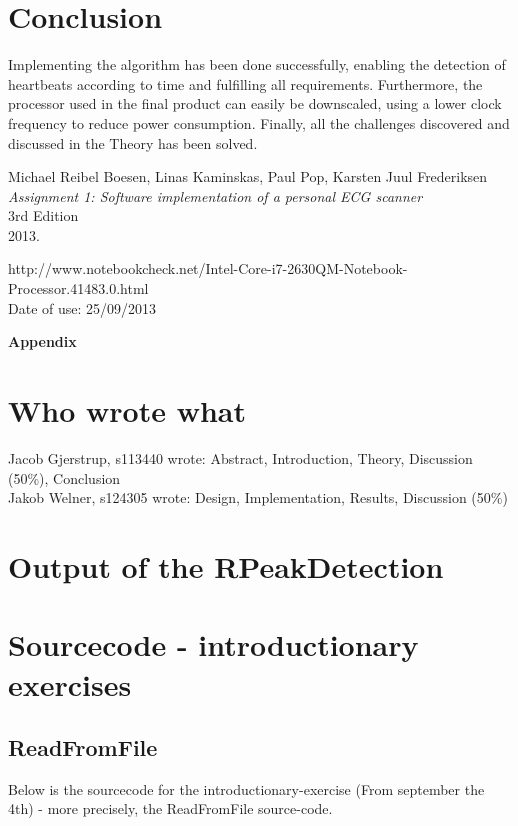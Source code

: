 \documentclass[12pt,a4paper]{article}
\begin{document}
\section{Conclusion}
	Implementing the algorithm has been done successfully, enabling the detection of heartbeats according to time and fulfilling all requirements. Furthermore, the processor  used in the final product can easily be downscaled, using a lower clock frequency to reduce power consumption. Finally, all the challenges discovered and discussed in the Theory has been solved.
\newpage
\begin{thebibliography}{9}

  Michael Reibel Boesen, Linas Kaminskas, Paul Pop, Karsten Juul Frederiksen\\
  \emph{Assignment 1: Software implementation of a personal ECG scanner}\\
  3rd Edition\\
  2013.

	http://www.notebookcheck.net/Intel-Core-i7-2630QM-Notebook-Processor.41483.0.html\\
	Date of use: 25/09/2013
\end{thebibliography}
	
\newpage	
	\begin{Large}
		\textbf{Appendix}
	\end{Large}
	\appendix

\section{Who wrote what}
Jacob Gjerstrup, s113440 wrote: Abstract, Introduction, Theory, Discussion (50\%), Conclusion\\
Jakob Welner, s124305 wrote: Design, Implementation, Results, Discussion (50\%)\\

\section{Output of the RPeakDetection}
	

	
\section{Sourcecode - introductionary exercises}
\subsection{ReadFromFile}
	Below is the sourcecode for the introductionary-exercise (From september the 4th) - more precisely, the ReadFromFile source-code.\\
	\\
	
\end{document}
